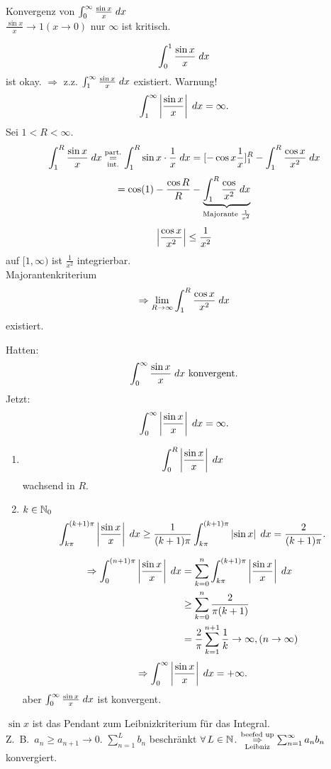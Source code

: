 \documentclass[../ana2.tex]{subfiles}
\begin{document}
\begin{bsp}
    Konvergenz von \( \integral{\frac{\sin x}{x}}{0}{\infty} \) \\
    \( \frac{\sin x}{x} \rightarrow 1 (x \rightarrow 0) \)
    nur \( \infty \) ist kritisch.
\end{bsp}
\begin{bew}
    \[ \integral{\frac{\sin x}{x}}{0}{1} \]
    ist okay.
    \( \Rightarrow \) z.z. \( \integral{\frac{\sin x}{x}}{1}{\infty} \)
    existiert. 
    Warnung!
    \[ \integral{\abs{\frac{\sin x}{x}}}{1}{\infty} 
    = \infty. \]
    Sei \( 1 < R < \infty \).
    \[ \integral{\frac{\sin x}{x}}{1}{R} 
    \overundersett{part.}{int.}{=}
    \integral{\sin x \cdot \frac{1}{x}}{1}{R} 
    = [-\cos x \frac{1}{x}]_1^R 
    - \integral{\frac{\cos x}{x^2}}{1}{R} \]
    \[ = \cos(1) - \frac{\cos R}{R} 
    - \underbrace{\integral{\frac{\cos}{x^2}}{1}{R}}
    _{\text{Majorante } \frac{1}{x^2}} \]
    \[ \abs{\frac{\cos x}{x^2}} \leq \frac{1}{x^2} \]
    auf \( [1,\infty) \) ist \( \frac{1}{x^2} \) 
    integrierbar.\\
    Majorantenkriterium 
    \[ \Rightarrow \limes{R} 
    \integral{\frac{\cos x}{x^2}}{1}{R} \]
    existiert.
\end{bew}
Hatten:
\[ \integral{\frac{\sin x}{x}}{0}{\infty} \text{ konvergent}. \]
Jetzt: 
\[ \integral{\abs{\frac{\sin x}{x}}}{0}{\infty} = \infty. \]
\begin{enumerate}
    \item \[ \integral{\abs{\frac{\sin x}{x}}}{0}{R} \]
    wachsend in \(R\).
    \item \( k \in \N_0 \)
    \[ \integral{\abs{\frac{\sin x}{x}}}{k \pi}{(k+1)\pi} 
    \geq \frac{1}{(k+1)\pi} \integral{\abs{\sin x}}{k \pi}{(k+1)\pi}
    = \frac{2}{(k+1)\pi}. \]

    \begin{align*}
        \Rightarrow \integral{\abs{\frac{\sin x}{x}}}{0}{(n+1)\pi}
        &= \sum_{k=0}^n \integral{\abs{\frac{\sin x}{x}}}{k\pi}{(k+1)\pi} \\
        &\geq \sum_{k=0}^n \frac{2}{\pi(k+1)}  \\
        &= \frac{2}{\pi} \sum_{k=1}^{n+1} \frac{1}{k}
        \rightarrow \infty, (n \rightarrow \infty)
    \end{align*}
    \[ \Rightarrow \integral{\abs{\frac{\sin x}{x}}}{0}{\infty} 
    = +\infty. \]
    aber \( \integral{\frac{\sin x}{x}}{0}{\infty} \) ist 
    konvergent.
\end{enumerate}
\begin{bem}
    \( \sin x \) ist das Pendant zum Leibnizkriterium 
    für das Integral.\\
    Z.\ B.\  \( a_n \geq a_{n+1} \rightarrow 0 \).
    \( \sum_{n=1}^L b_n \) beschränkt \( \forall L\in\N \).
    \( \overundersett{beefed up}{Leibniz}{\Rightarrow}
    \sum_{n=1}^\infty a_n b_n \) konvergiert. 
\end{bem}
\end{document}

